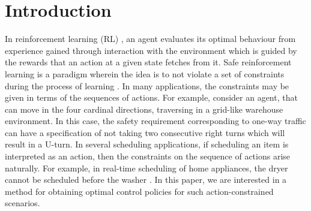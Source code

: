 \documentclass[letterpaper, 10 pt, conference]{ieeeconf}
\begin{document}
\section{Introduction}\label{intro}
In reinforcement learning (RL) \cite{sutton2018reinforcement}, an agent evaluates its optimal behaviour from experience gained through interaction with the environment which is guided by the rewards that an action at a given state fetches from it. Safe reinforcement learning is a paradigm wherein the idea is to not violate a set of constraints during the process of learning \cite{garcia2015comprehensive}. In many applications, the constraints may be given in terms of the sequences of actions. For example, consider an agent, that can move in the four cardinal directions, traversing in a grid-like warehouse environment. In this case, the safety requirement corresponding to one-way traffic can have a specification of not taking two consecutive right turns which will result in a U-turn. %
In several scheduling applications, if scheduling an item is interpreted as an action, then the constraints on the sequence of actions arise naturally. For example, in real-time scheduling of home appliances, the dryer cannot be scheduled before the washer \cite{sou2011scheduling, kaur2021machine}. In this paper, we are interested in a method for obtaining optimal control policies for such action-constrained scenarios.

\end{document}
